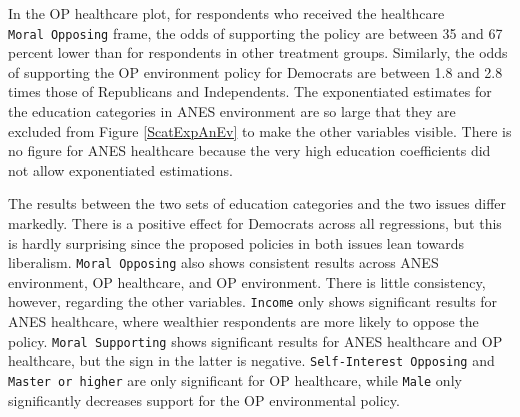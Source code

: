 \documentclass[12pt,econ]{sources/authesis}
\begin{document}
In the OP healthcare plot, for respondents who received the healthcare \texttt{Moral\ Opposing} frame, the odds of supporting the policy are between 35 and 67 percent lower than for respondents in other treatment groups. Similarly, the odds of supporting the OP environment policy for Democrats are between 1.8 and 2.8 times those of Republicans and Independents. The exponentiated estimates for the education categories in ANES environment are so large that they are excluded from Figure \ref{ScatExpAnEv} to make the other variables visible. There is no figure for ANES healthcare because the very high education coefficients did not allow exponentiated estimations.

The results between the two sets of education categories and the two issues differ markedly. There is a positive effect for Democrats across all regressions, but this is hardly surprising since the proposed policies in both issues lean towards liberalism. \texttt{Moral\ Opposing} also shows consistent results across ANES environment, OP healthcare, and OP environment. There is little consistency, however, regarding the other variables. \texttt{Income} only shows significant results for ANES healthcare, where wealthier respondents are more likely to oppose the policy. \texttt{Moral\ Supporting} shows significant results for ANES healthcare and OP healthcare, but the sign in the latter is negative. \texttt{Self-Interest\ Opposing} and \texttt{Master\ or\ higher} are only significant for OP healthcare, while \texttt{Male} only significantly decreases support for the OP environmental policy.
\end{document}
